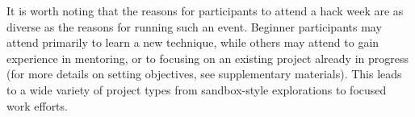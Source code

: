\noindent It is worth noting that the reasons for participants to attend a hack week are as diverse as the reasons for running such an event.
Beginner participants may attend primarily to learn a new technique, while others may attend to gain experience in mentoring, or to focusing on an existing project already in progress (for more details on setting objectives, see supplementary materials).
This leads to a wide variety of project types from sandbox-style explorations to focused work efforts.
